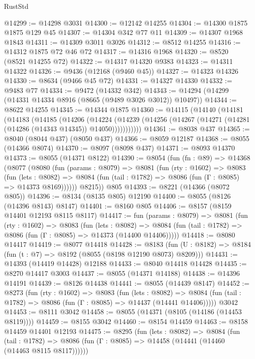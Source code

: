 \begin{lexlean}{RustStd}
\begin{coremodule}
@14299 := @14298 @3031
@14300 := @12142 @14255
@14304 := @14300 @1875 @1875 @129 @45
@14307 := @14304 @342 @77 @11
@14309 := @14307 @1968 @1843
@14311 := @14309 @3011 @3026
@14312 := @8512 @14255
@14316 := @14312 @1875 @72 @46 @72
@14317 := @14316 @1968
@14320 := @8520 (@8521 @14255 @72)
@14322 := @14317 @14320 @9383
@14323 := @14311 @14322
@14326 := @9436 (@12168 (@9460 @45))
@14327 := @14323 @14326
@14330 := @8634 (@9466 @45 @72)
@14331 := @14327 @14330
@14332 := @9483 @77
@14334 := @9472 (@14332 @342)
@14343 := @14294 (@14299 (@14331 @14334 @8916 (@8665 (@9489 @3026 @3012)) @10497))
@14344 := @8622 @14255
@14345 := @14344 @1875
@14360 := @14115
    (@14140
      (@14181
        (@14183
          (@14185
            (@14206
              (@14224
                (@14239 (@14256 (@14267 (@14271 (@14281 (@14286 (@14343 @14345)) @14050)))))))))))
@14361 := @8038 @437
@14365 := @8040 (@8044 @437) (@8050 @437)
@14366 := @8059 @12187
@14368 := @8055 (@14366 @8074)
@14370 := @8097 (@8098 @437)
@14371 := @8093 @14370
@14373 := @8055 (@14371 @8122)
@14390 := @8054
    (fun (fn : @89) =>
    @14368
      (@8077
        (@8080
          (fun (params : @8079) =>
          @8081
            (fun (rty : @1602) =>
            @8083
              (fun (lets : @8082) =>
              @8084 (fun (tail : @1782) => @8086 (fun (Γ : @8085) => @14373 @8169))))))
        @8215))
    @805
@14393 := @8221 (@14366 (@8072 @805))
@14396 := @8134 (@8135 @805) @12190
@14400 := @8055 (@8126 (@14396 @8143) @8147)
@14401 := @8160 @805
@14406 := @8157 (@8159 @14401 @12193 @8115 @8117)
@14417 := fun (params : @8079) =>
  @8081
    (fun (rty : @1602) =>
    @8083
      (fun (lets : @8082) =>
      @8084 (fun (tail : @1782) => @8086 (fun (Γ : @8085) => @14373 (@14400 @14406)))))
@14418 := @8080 @14417
@14419 := @8077 @14418
@14428 := @8183
    (fun (U : @8182) => @8184 (fun (t : @7) => @8192 (@8055 (@8198 @12190 @8073) @8209)))
@14431 := @14393 (@14419 @14428) @12188
@14433 := @8040 @14418 @14428
@14435 := @8270 @14417 @3003
@14437 := @8055 (@14371 @14188)
@14438 := @14396 @14191
@14439 := @8126 @14438
@14441 := @8055 (@14439 @8147)
@14452 := @8273
    (fun (rty : @1602) =>
    @8083
      (fun (lets : @8082) =>
      @8084 (fun (tail : @1782) => @8086 (fun (Γ : @8085) => @14437 (@14441 @14406)))))
    @3042
@14453 := @8111 @3042
@14458 := @8055 (@14371 (@8105 (@14186 (@14453 @8119))))
@14459 := @8155 @3042
@14460 := @8154 @14459
@14463 := @8158 @14459 @14401 @12193
@14475 := @8295
    (fun (lets : @8082) =>
    @8084
      (fun (tail : @1782) =>
      @8086 (fun (Γ : @8085) => @14458 (@14441 (@14460 (@14463 @8115 @8117))))))

\end{coremodule}
\end{lexlean}
